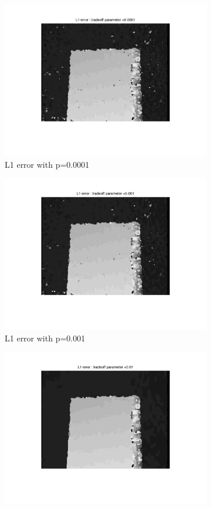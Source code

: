 \documentclass[fleqn]{article}
\begin{document}
\begin{figure}[!ht]
\begin{subfigure}{0.5\textwidth}
\includegraphics[scale=0.2]{./pics/map_L1_error_p=0.0001.jpg}
\caption{L1 error with p=0.0001}
\end{subfigure}
 \begin{subfigure}{0.5\textwidth}
\includegraphics[scale=0.2]{./pics/map_L1_error_p=0.001.jpg}
\caption{L1 error with p=0.001}
\end{subfigure}
 \begin{subfigure}{0.5\textwidth}
\includegraphics[scale=0.2]{./pics/map_L1_error_p=0.01.jpg}

\end{subfigure}
\end{figure}
\end{document}
